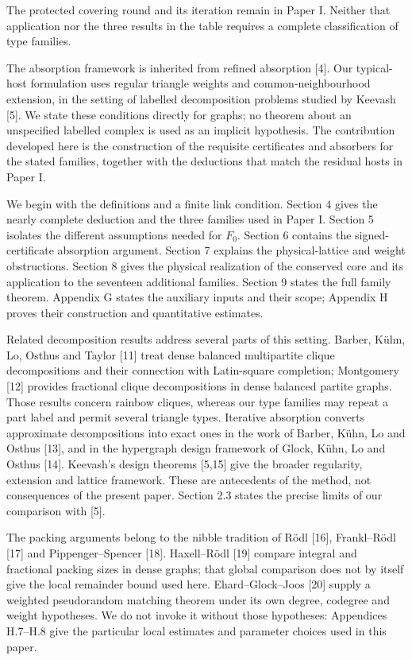 \documentclass[english,11pt,a4paper]{article}
\begin{document}
The protected covering round and its iteration remain in Paper I. Neither that application nor the three results in the table requires a complete classification of type families.

The absorption framework is inherited from refined absorption {[}4{]}. Our typical-host formulation uses regular triangle weights and common-neighbourhood extension, in the setting of labelled decomposition problems studied by Keevash {[}5{]}. We state these conditions directly for graphs; no theorem about an unspecified labelled complex is used as an implicit hypothesis. The contribution developed here is the construction of the requisite certificates and absorbers for the stated families, together with the deductions that match the residual hosts in Paper I.

We begin with the definitions and a finite link condition. Section 4 gives the nearly complete deduction and the three families used in Paper I. Section 5 isolates the different assumptions needed for \(F_0\). Section 6 contains the signed-certificate absorption argument. Section 7 explains the physical-lattice and weight obstructions. Section 8 gives the physical realization of the conserved core and its application to the seventeen additional families. Section 9 states the full family theorem. Appendix G states the auxiliary inputs and their scope; Appendix H proves their construction and quantitative estimates.

Related decomposition results address several parts of this setting. Barber, Kühn, Lo, Osthus and Taylor {[}11{]} treat dense balanced multipartite clique decompositions and their connection with Latin-square completion; Montgomery {[}12{]} provides fractional clique decompositions in dense balanced partite graphs. Those results concern rainbow cliques, whereas our type families may repeat a part label and permit several triangle types. Iterative absorption converts approximate decompositions into exact ones in the work of Barber, Kühn, Lo and Osthus {[}13{]}, and in the hypergraph design framework of Glock, Kühn, Lo and Osthus {[}14{]}. Keevash's design theorems {[}5,15{]} give the broader regularity, extension and lattice framework. These are antecedents of the method, not consequences of the present paper. Section 2.3 states the precise limits of our comparison with {[}5{]}.

The packing arguments belong to the nibble tradition of Rödl {[}16{]}, Frankl--Rödl {[}17{]} and Pippenger--Spencer {[}18{]}. Haxell--Rödl {[}19{]} compare integral and fractional packing sizes in dense graphs; that global comparison does not by itself give the local remainder bound used here. Ehard--Glock--Joos {[}20{]} supply a weighted pseudorandom matching theorem under its own degree, codegree and weight hypotheses. We do not invoke it without those hypotheses: Appendices H.7--H.8 give the particular local estimates and parameter choices used in this paper.
\end{document}
